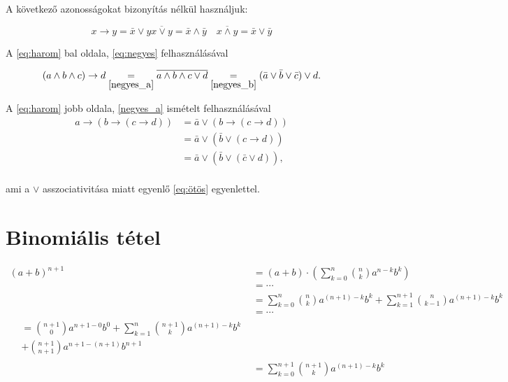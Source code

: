 \documentclass{article}
\begin{document}
A következő azonosságokat bizonyítás nélkül használjuk:

\begin{subequations}
\begin{equation}
x \rightarrow y = \bar{x} \vee y
\label{negyes_a}
\end{equation}
\begin{equation}
\overline{x \vee y} = \bar{x} \wedge \bar{y} 
\quad
\overline{x \wedge y} = \bar{x} \vee \bar{y}
\label{negyes_b}
\end{equation}
\label{eq:negyes}
\end{subequations}

A \eqref{eq:harom} bal oldala, \eqref{eq:negyes} felhasználásával

\begin{equation}
(a \wedge b \wedge c) \rightarrow d \underset{\eqref{negyes_a}}{=}  \overline{a \wedge b \wedge c \vee d} \underset{\eqref{negyes_b}}{=} ( \bar{a} \vee \bar{b} \vee \bar{c} ) \vee d.
\label{eq:ötös}
\end{equation}

A \eqref{eq:harom} jobb oldala, \eqref{negyes_a} ismételt felhasználásával
\begin{align}
a \rightarrow ( b \rightarrow ( c \rightarrow d ) ) &= \bar{a} \vee ( b \rightarrow ( c \rightarrow d ) ) \\ \nonumber
&= \bar{a} \vee ( \bar{b} \vee ( c \rightarrow d ) ) \\ \nonumber
&= \bar{a} \vee ( \bar{b} \vee ( \bar{c} \vee d ) ) \text{,} \\ \nonumber
\label{hatos}
\end{align}

ami a $\vee$ asszociativitása miatt egyenlő \eqref{eq:ötös} egyenlettel.

\section{Binomiális tétel}

\begin{subequations}
\begin{align}
(a+b)^{n+1} &= (a+b) \cdot \left( \sum_{k=0}^n \binom{n}{k} a^{n-k}b^k \right) \\
&= \cdots \\ \nonumber
&= \sum_{k=0}^n \binom{n}{k} a^{(n+1)-k}b^k 
+ \sum_{k=1}^{n+1} \binom{n}{k-1} a^{(n+1)-k}b^{k} \\
&= \cdots \\ \nonumber
\begin{split}
&= \binom{n+1}{0} a^{n+1-0} b^0 + \sum_{k=1}^n \binom{n+1}{k} a^{(n+1)-k}b^k \\ &+ \binom{n+1}{n+1} a^{n+1-(n+1)} b^{n+1} 
\end{split} \\
&= \sum_{k=0}^{n+1} \binom{n+1}{k} a^{(n+1)-k}b^k 
\end{align}


\end{subequations}
\end{document}

